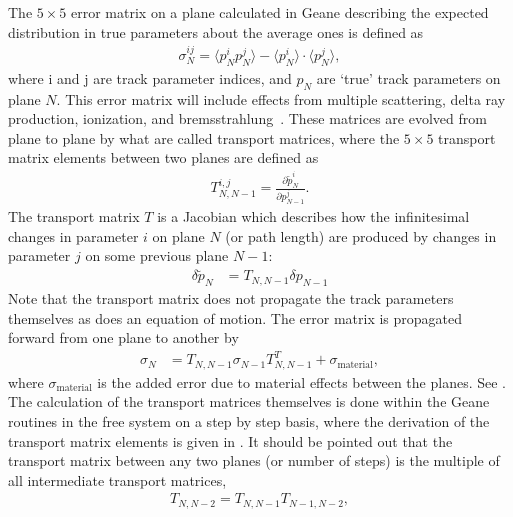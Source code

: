 The $5 \times 5$ error matrix on a plane calculated in Geane describing the expected distribution in true parameters about the average ones is defined as
    \begin{align} \label{eq:errormatrix}
        \sigma_{N}^{ij} = \langle p_{N}^{i}p_{N}^{j}\rangle - \langle p_{N}^{i}\rangle \cdot \langle p_{N}^{j}\rangle,
    \end{align} 
where i and j are track parameter indices, and $p_{N}$ are `true' track parameters on plane $N$. This error matrix will include effects from multiple scattering, delta ray production, ionization, and bremsstrahlung~\cite{geanemanual,Lavezzi,energyloss}. These matrices are evolved from plane to plane by what are called transport matrices, where the $5 \times 5$ transport matrix elements between two planes are defined as 
    \begin{align} \label{eq:transportmatrix}
        T_{N,N-1}^{i,j} = \frac{\partial \widetilde{p}^{i}_{N}}{\partial p^{j}_{N-1}}.
    \end{align}
The transport matrix $T$ is a Jacobian which describes how the infinitesimal changes in parameter $i$ on plane $N$ (or path length) are produced by changes in parameter $j$ on some previous plane $N-1$:
    \begin{align} \label{eq:parametertransport}
        \delta \widetilde{p}_{N} &= T_{N,N-1} \delta p_{N-1}
    \end{align}
Note that the transport matrix does not propagate the track parameters themselves as does an equation of motion. The error matrix is propagated forward from one plane to another by
    \begin{align} \label{eq:errortransport}
        \sigma_{N} &= T_{N,N-1} \sigma_{N-1} T_{N,N-1}^{T} + \sigma_{\text{material}},
    \end{align}
where $\sigma_{\text{material}}$ is the added error due to material effects between the planes. See . The calculation of the transport matrices themselves is done within the Geane routines in the free system on a step by step basis, where the derivation of the transport matrix elements is given in . It should be pointed out that the transport matrix between any two planes (or number of steps) is the multiple of all intermediate transport matrices,
    \begin{align}
        T_{N,N-2} = T_{N,N-1} T_{N-1,N-2},
    \end{align}
